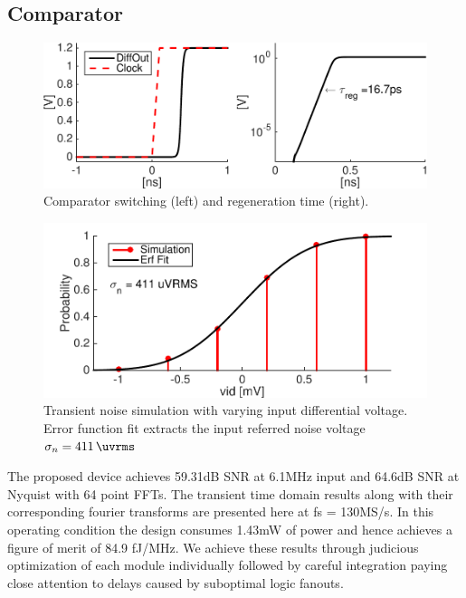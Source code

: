 \documentclass[10pt,journal]{IEEEtran}\usepackage{longtable}
\begin{document}
\subsection{Comparator}
\begin{figure}[tbph]
\begin{center}
\includegraphics[width=1\columnwidth]{Comparator_Result_Reg_Time.pdf}
\caption{Comparator switching (left) and regeneration time (right).}
\label{fig:ComparatorRegTime}
\end{center}
\end{figure}
\begin{figure}[tbph]
\begin{center}
\includegraphics[width=1\columnwidth]{ComparatorTranNoise.pdf}
\caption{Transient noise simulation with varying input differential voltage. Error function fit extracts the input referred noise voltage $\sigma_{n}=\SI{411}{\uvrms}$}
\label{fig:ComparatorTranNoise}
\end{center}
\end{figure}


The proposed device achieves 59.31dB SNR at 6.1MHz input and 64.6dB SNR at Nyquist with 64 point FFTs.
The transient time domain results along with their corresponding fourier transforms are presented here at fs = 130MS/s.
In this operating condition the design consumes 1.43mW of power and hence achieves a figure of merit of 84.9 fJ/MHz.
We achieve these results through judicious optimization of each module individually followed by careful integration paying close attention to delays caused by suboptimal logic fanouts.
\end{document}

